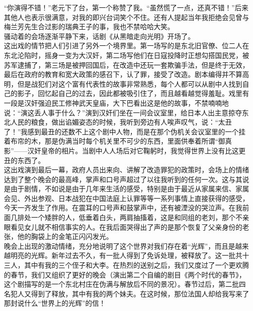 “你演得不错！”老元下了台，第一个称赞了我。“虽然慌了一点，还真不错！”后来其他人也表示很满意，对我的即兴台词笑个不住。还有人提起当年我拒绝会见曾与梅兰芳先生合过影的瑞典王子的事，我也不禁哈哈大笑。\\

骚动着的会场逐渐平静下来，话剧《从黑暗走向光明》开场了。\\

这出戏的情节把人们引进了另外一个境界里。第一场写的是东北旧官僚、位二人在东北沦陷时，摇身一变为大汉奸，第二场写他们在日寇投降时正想勾搭国民党，被苏军逮捕了，第三场是被押回国后，在改造中还玩一套欺骗手法，但是终于无效，最后在政府的教育和宽大政策的感召下，认了罪，接受了改造。剧本编得并不算高明，但是战犯们对这个富有代表性的故事非常熟悉，每个人都可以从剧中人找到自己的影子，回忆起自己的过去，因此都被吸引住了，而且越看越觉得羞耻。戏里有一段是汉奸强迫民工修神武天皇庙，大下巴看出这是他的故事，不禁喃喃地说：“演这丢人事于什么？”演到汉奸们坐在一间会议室里，给日本人出主意掠夺东北人民的粮食，做出谄媚姿态的时候，我听到旁边有人唉声叹气，说：“太丑了！”我感到最丑的还数不上这个剧中人物，而是在那个伪机关会议室里的一个挂着布帘的木，那是伪满当时每个机关里不可少的东西，里面供奉着所谓“御真影”——汉奸皇帝的相片。当剧中人人场后对它鞠躬时，我觉得世界上没有比这更丑的东西了。\\

这出戏演到最后一幕，政府人员出来向、讲解了改造罪犯的政策时，会场上的情绪达到了整个晚会的最高峰，掌声和口号声超过了以往我听到的任何一次。这与其说是由于剧情，不如说是由于几年来生活的感受，特别是由于最近从家属来信、家属会见、外出参观、日本战犯在中国法庭上认罪等等一系列事情上直接获得的感受，今天一齐发生了作用。在震耳的口号声和鼓掌声中，还有被湮没的哭泣声。在我前面几排处一个矮胖的人，低垂着白头，两肩抽搐着，这是和同组的老刘，那个不亲眼看见女儿就不相信事实的人。在我后面哭得出了声的是那个恢复了父亲身份的老张，他的胸袋上的金笔正闪闪发光。\\

晚会上出现的激动情绪，充分地说明了这个世界对我们存在着“光辉”，而且是越来越明亮的光辉。新年过去不久，有一批人得到了免诉处理，被释放了。这一批共十三人，其中有我的三个侄子和大李。在热烈的送别之后，我们又度过了一个更欢腾的春节，我们又组织了更好的晚会（演出第二个自编的剧目《两个时代的春节》，这个剧描写的是一个东北村庄在伪满与解放后不同的景况）。春节过后，第二批四名犯人又得到了释放，其中有我的两个妹夫。在这时候，那位法国人却给我写来了那封说什么“世界上的光辉”的信！
